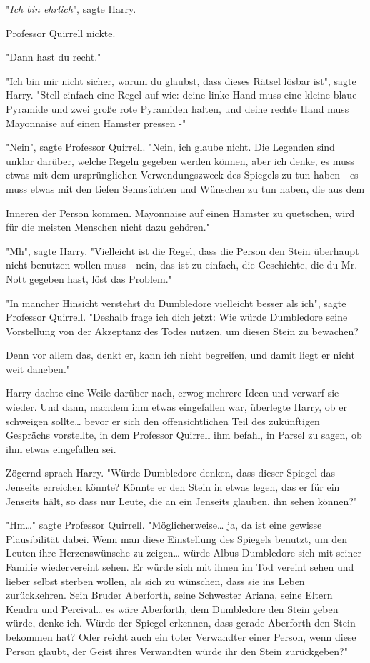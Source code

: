 {"\emph{Ich bin ehrlich}", sagte Harry.

Professor Quirrell nickte.

"Dann hast du recht."

"Ich bin mir nicht sicher, warum du glaubst, dass dieses Rätsel lösbar ist", sagte Harry. "Stell einfach eine Regel auf wie: deine linke Hand muss eine kleine blaue Pyramide und zwei große rote Pyramiden halten, und deine rechte Hand muss Mayonnaise auf einen Hamster pressen -"

"Nein", sagte Professor Quirrell. "Nein, ich glaube nicht. Die Legenden sind unklar darüber, welche Regeln gegeben werden können, aber ich denke, es muss etwas mit dem ursprünglichen Verwendungszweck des Spiegels zu tun haben - es muss etwas mit den tiefen Sehnsüchten und Wünschen zu tun haben, die aus dem

Inneren der Person kommen. Mayonnaise auf einen Hamster zu quetschen, wird für die meisten Menschen nicht dazu gehören."

"Mh", sagte Harry. "Vielleicht ist die Regel, dass die Person den Stein überhaupt nicht benutzen wollen muss - nein, das ist zu einfach, die Geschichte, die du Mr. Nott gegeben hast, löst das Problem."

"In mancher Hinsicht verstehst du Dumbledore vielleicht besser als ich", sagte Professor Quirrell. "Deshalb frage ich dich jetzt: Wie würde Dumbledore seine Vorstellung von der Akzeptanz des Todes nutzen, um diesen Stein zu bewachen?

Denn vor allem das, denkt er, kann ich nicht begreifen, und damit liegt er nicht weit daneben."

Harry dachte eine Weile darüber nach, erwog mehrere Ideen und verwarf sie wieder. Und dann, nachdem ihm etwas eingefallen war, überlegte Harry, ob er schweigen sollte… bevor er sich den offensichtlichen Teil des zukünftigen Gesprächs vorstellte, in dem Professor Quirrell ihm befahl, in Parsel zu sagen, ob ihm etwas eingefallen sei.

Zögernd sprach Harry. "Würde Dumbledore denken, dass dieser Spiegel das Jenseits erreichen könnte? Könnte er den Stein in etwas legen, das er für ein Jenseits hält, so dass nur Leute, die an ein Jenseits glauben, ihn sehen können?"

"Hm…" sagte Professor Quirrell. "Möglicherweise… ja, da ist eine gewisse Plausibilität dabei. Wenn man diese Einstellung des Spiegels benutzt, um den Leuten ihre Herzenswünsche zu zeigen… würde Albus Dumbledore sich mit seiner Familie wiedervereint sehen. Er würde sich mit ihnen im Tod vereint sehen und lieber selbst sterben wollen, als sich zu wünschen, dass sie ins Leben zurückkehren. Sein Bruder Aberforth, seine Schwester Ariana, seine Eltern Kendra und Percival… es wäre Aberforth, dem Dumbledore den Stein geben würde, denke ich. Würde der Spiegel erkennen, dass gerade Aberforth den Stein bekommen hat? Oder reicht auch ein toter Verwandter einer Person, wenn diese Person glaubt, der Geist ihres Verwandten würde ihr den Stein zurückgeben?"

}
